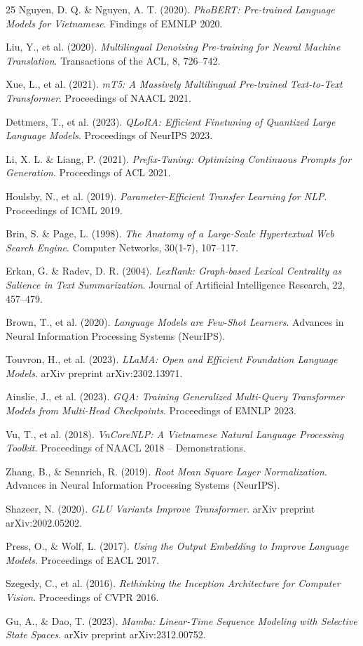\documentclass{article}
\begin{document}
\begin{thebibliography}{25}
Nguyen, D. Q. \& Nguyen, A. T. (2020).
\textit{PhoBERT: Pre-trained Language Models for Vietnamese}.
Findings of EMNLP 2020.

Liu, Y., et al. (2020).
\textit{Multilingual Denoising Pre-training for Neural Machine Translation}.
Transactions of the ACL, 8, 726--742.

Xue, L., et al. (2021).
\textit{mT5: A Massively Multilingual Pre-trained Text-to-Text Transformer}.
Proceedings of NAACL 2021.

Dettmers, T., et al. (2023).
\textit{QLoRA: Efficient Finetuning of Quantized Large Language Models}.
Proceedings of NeurIPS 2023.

Li, X. L. \& Liang, P. (2021).
\textit{Prefix-Tuning: Optimizing Continuous Prompts for Generation}.
Proceedings of ACL 2021.

Houlsby, N., et al. (2019).
\textit{Parameter-Efficient Transfer Learning for NLP}.
Proceedings of ICML 2019.

Brin, S. \& Page, L. (1998).
\textit{The Anatomy of a Large-Scale Hypertextual Web Search Engine}.
Computer Networks, 30(1-7), 107--117.

Erkan, G. \& Radev, D. R. (2004).
\textit{LexRank: Graph-based Lexical Centrality as Salience in Text Summarization}.
Journal of Artificial Intelligence Research, 22, 457--479.

Brown, T., et al. (2020).
\textit{Language Models are Few-Shot Learners}.
Advances in Neural Information Processing Systems (NeurIPS).

Touvron, H., et al. (2023).
\textit{LLaMA: Open and Efficient Foundation Language Models}.
arXiv preprint arXiv:2302.13971.

Ainslie, J., et al. (2023).
\textit{GQA: Training Generalized Multi-Query Transformer Models from Multi-Head Checkpoints}.
Proceedings of EMNLP 2023.

Vu, T., et al. (2018).
\textit{VnCoreNLP: A Vietnamese Natural Language Processing Toolkit}.
Proceedings of NAACL 2018 -- Demonstrations.

Zhang, B., \& Sennrich, R. (2019).
\textit{Root Mean Square Layer Normalization}.
Advances in Neural Information Processing Systems (NeurIPS).

Shazeer, N. (2020).
\textit{GLU Variants Improve Transformer}.
arXiv preprint arXiv:2002.05202.

Press, O., \& Wolf, L. (2017).
\textit{Using the Output Embedding to Improve Language Models}.
Proceedings of EACL 2017.

Szegedy, C., et al. (2016).
\textit{Rethinking the Inception Architecture for Computer Vision}.
Proceedings of CVPR 2016.

Gu, A., \& Dao, T. (2023).
\textit{Mamba: Linear-Time Sequence Modeling with Selective State Spaces}.
arXiv preprint arXiv:2312.00752.

\end{thebibliography}
\end{document}

